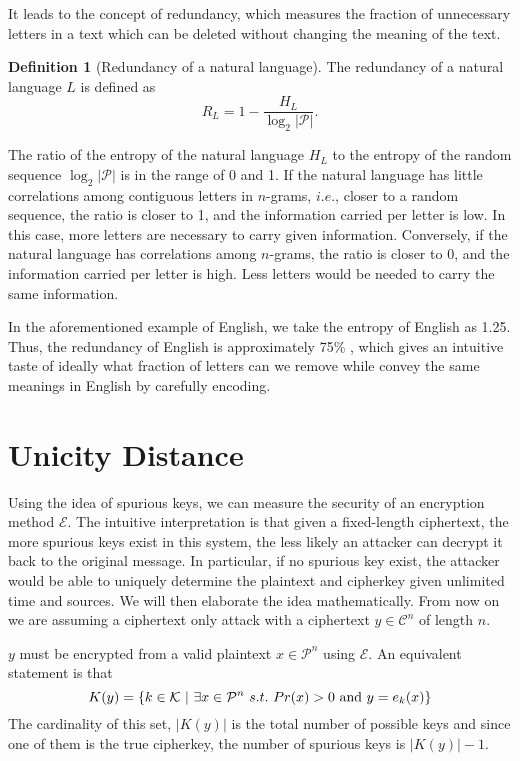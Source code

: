 \documentclass[letterpaper, 10 pt, conference]{ieeeconf}  %
\theoremstyle{definition}
\newtheorem{definition}{Definition}[section]
\theoremstyle{property}
\begin{document}
It leads to the concept of redundancy, which measures the fraction of unnecessary letters in a text which can be deleted without changing the meaning of the text.

\begin{definition}[Redundancy of a natural language]
\label{equ:redundancy_lang}
The redundancy of a natural language $L$ is defined as $$R_L = 1-\frac{H_L}{\log_2|\mathcal{P}|}.$$
\end{definition}

The ratio of the entropy of the natural language $H_L$ to the entropy of the random sequence $\log_2|\mathcal{P}|$ is in the range of 0 and 1. If the natural language has little correlations among contiguous letters in $n$-grams, $i.e.$, closer to a random sequence, the ratio is closer to 1, and the information carried per letter is low. In this case, more letters are necessary to carry given information. Conversely, if the natural language has correlations among $n$-grams, the ratio is closer to 0, and the information carried per letter is high. Less letters would be needed to carry the same information. 

In the aforementioned example of English, we take the entropy of English as 1.25. Thus, the redundancy of English is approximately 75\% \cite{basisofredundancy, shankar1997shannon}, which gives an intuitive taste of ideally what fraction of letters can we remove while convey the same meanings in English by carefully encoding.


\section{Unicity Distance}
Using the idea of spurious keys, we can measure the security of an encryption method $\mathcal{E}$. The intuitive interpretation is that given a fixed-length ciphertext, the more spurious keys exist in this system, the less likely an attacker can decrypt it back to the original message. In particular, if no spurious key exist, the attacker would be able to uniquely determine the plaintext and cipherkey given unlimited time and sources. We will then elaborate the idea mathematically. From now on we are assuming a ciphertext only attack with a ciphertext $y\in \mathcal{C}^n$ of length $n$.

$y$ must be encrypted from a valid plaintext $x\in \mathcal{P}^n$ using $\mathcal{E}$. An equivalent statement is that 
$$
K(y) = \{k\in \mathcal{K}~\vert~ \exists x\in \mathcal{P}^n ~s.t.~ Pr(x)> 0 ~\hbox{and}~ y=e_k(x) \}
$$
The cardinality of this set, $\vert K(y) \vert$ is the total number of possible keys and since one of them is the true cipherkey, the number of spurious keys is $\vert K(y) \vert-1$. 
\end{document}
